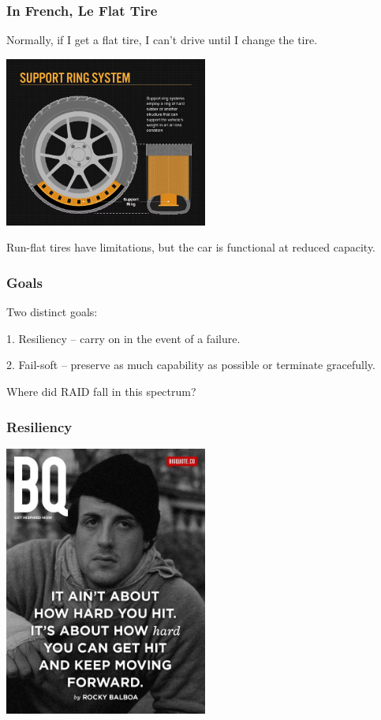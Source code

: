 \begin{frame}
\frametitle{In French, Le Flat Tire}

Normally, if I get a flat tire, I can't drive until I change the tire.

\begin{center}
	\includegraphics[width=0.5\textwidth]{images/runflat.jpg}
\end{center}

Run-flat tires have limitations, but the car is functional at reduced capacity.

\end{frame}

\begin{frame}
\frametitle{Goals}

Two distinct goals:

1. Resiliency -- carry on in the event of a failure.

2. Fail-soft -- preserve as much capability as possible or terminate gracefully.

Where did RAID fall in this spectrum?

\end{frame}

\begin{frame}
\frametitle{Resiliency}

\begin{center}
	\includegraphics[width=0.5\textwidth]{images/rocky.jpg}
\end{center}

\end{frame}


